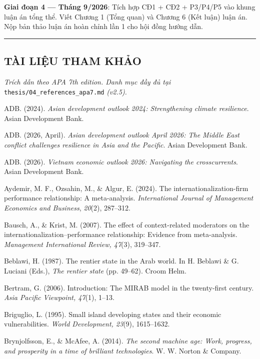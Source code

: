 \documentclass[12pt,a4paper]{article}
\begin{document}
\textbf{Giai đoạn 4 --- Tháng 9/2026}: Tích hợp CĐ1 + CĐ2 + P3/P4/P5 vào
khung luận án tổng thể. Viết Chương 1 (Tổng quan) và Chương 6 (Kết luận)
luận án. Nộp bản thảo luận án hoàn chỉnh lần 1 cho hội đồng hướng dẫn.

\begin{center}\rule{0.5\linewidth}{0.5pt}\end{center}

\hypertarget{tuxe0i-liux1ec7u-tham-khux1ea3o}{%
\subsection{TÀI LIỆU THAM KHẢO}\label{tuxe0i-liux1ec7u-tham-khux1ea3o}}

\emph{Trích dẫn theo APA 7th edition. Danh mục đầy đủ tại}
\texttt{thesis/04\_references\_apa7.md} \emph{(v2.5).}

ADB. (2024). \emph{Asian development outlook 2024: Strengthening climate
resilience}. Asian Development Bank.

ADB. (2026, April). \emph{Asian development outlook April 2026: The
Middle East conflict challenges resilience in Asia and the Pacific}.
Asian Development Bank.

ADB. (2026). \emph{Vietnam economic outlook 2026: Navigating the
crosscurrents}. Asian Development Bank.

Aydemir, M. F., Ozsahin, M., \& Algur, E. (2024). The
internationalization-firm performance relationship: A meta-analysis.
\emph{International Journal of Management Economics and Business},
\emph{20}(2), 287--312.

Bausch, A., \& Krist, M. (2007). The effect of context-related
moderators on the internationalization--performance relationship:
Evidence from meta-analysis. \emph{Management International Review,
47}(3), 319--347.

Beblawi, H. (1987). The rentier state in the Arab world. In H. Beblawi
\& G. Luciani (Eds.), \emph{The rentier state} (pp. 49--62). Croom Helm.

Bertram, G. (2006). Introduction: The MIRAB model in the twenty-first
century. \emph{Asia Pacific Viewpoint, 47}(1), 1--13.

Briguglio, L. (1995). Small island developing states and their economic
vulnerabilities. \emph{World Development, 23}(9), 1615--1632.

Brynjolfsson, E., \& McAfee, A. (2014). \emph{The second machine age:
Work, progress, and prosperity in a time of brilliant technologies}. W.
W. Norton \& Company.
\end{document}
